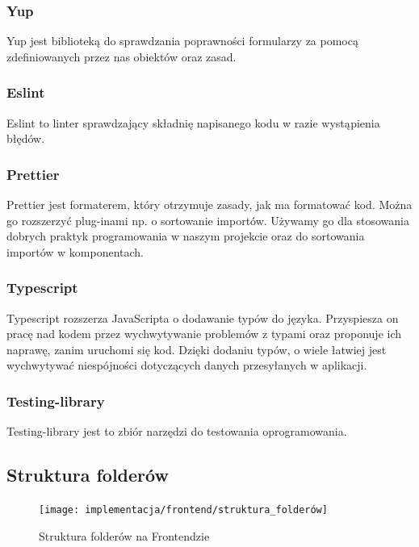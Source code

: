 \documentclass[a4paper,11pt]{report}
\begin{document}
\subsubsection{Yup}
Yup\cite{yup} jest biblioteką do sprawdzania poprawności formularzy za pomocą zdefiniowanych przez nas obiektów oraz zasad.

\subsubsection{Eslint}
Eslint\cite{eslint} to linter sprawdzający składnię napisanego kodu w razie wystąpienia błędów.\\  

\subsubsection{Prettier}
Prettier\cite{prettier} jest formaterem, który otrzymuje zasady, jak ma formatować kod.
 Można go rozszerzyć plug-inami np. o sortowanie importów.
 Używamy go dla stosowania dobrych praktyk programowania w naszym projekcie oraz do sortowania importów w komponentach.\\

\subsubsection{Typescript}
\label{subsec:typescript}
Typescript\cite{typescript} rozszerza JavaScripta o dodawanie typów do języka. 
Przyspiesza on pracę nad kodem przez wychwytywanie problemów z typami oraz proponuje ich naprawę, zanim uruchomi się kod.
Dzięki dodaniu typów, o wiele łatwiej jest wychwytywać niespójności dotyczących danych przesyłanych w aplikacji.\\

\subsubsection{Testing-library}
Testing-library\cite{testing-library} jest to zbiór narzędzi do testowania oprogramowania.\\

\subsection{Struktura folderów}
\begin{figure}[H]
	\centering
	\texttt{[image: implementacja/frontend/struktura\_folderów]}\\
	\caption{Struktura folderów na Frontendzie}
	\label{fig:struktura_folderów_front}
\end{figure}
\end{document}
